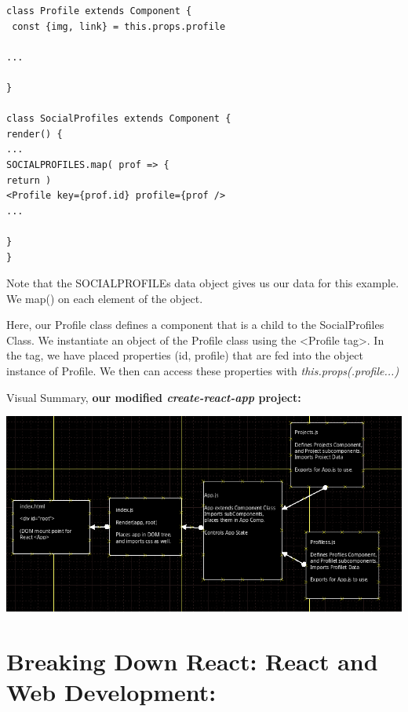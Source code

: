 \documentclass[8pt,a4paper]{extarticle}
\begin{document}
\begin{itemize}
\begin{verbatim}
class Profile extends Component {
 const {img, link} = this.props.profile

...

}

class SocialProfiles extends Component {
render() {
...
SOCIALPROFILES.map( prof => {
return )
<Profile key={prof.id} profile={prof />
...

}
}
\end{verbatim}

Note that the SOCIALPROFILEs data object gives us our data for this example. We map() on each element of the object.

Here, our Profile class defines a component that is a child to the SocialProfiles Class. We instantiate an object of the Profile class using the <Profile tag>. In the tag, we have placed properties (id, profile) that are fed into the object instance of Profile. We then can access these properties with \textit{this.props(.profile...)}
\end{itemize}

\item Visual Summary, \textbf{our modified \textit{create-react-app} project:}

\includegraphics[scale=0.5]{appstructure.png}


\section*{Breaking Down React: React and Web Development:}

\subsection{}

\subsubsection{}
\end{document}
